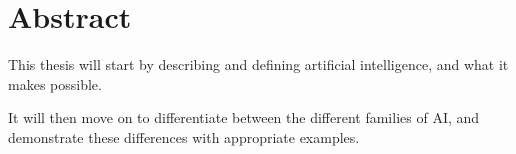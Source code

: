 \chapter*{Abstract}
This thesis will start by describing and defining artificial intelligence, and what it makes possible. 

It will then move on to differentiate between the different families of AI, and demonstrate these differences with appropriate examples.
